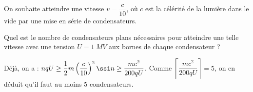 \medskip
On souhaite atteindre une vitesse $v=\dfrac{c}{10}$, où $c$ est la célérité de la lumière dans le vide par une mise en série de condensateurs.


\repriseEntrainement



\begin{enonce}
Quel est le nombre de condensateurs plans nécessaires pour atteindre une telle vitesse avec une tension $U=\SI{1}{MV}$ aux bornes de chaque condensateur ?
\end{enonce}


\begin{corrige}
Déjà, on a : $nqU\geq \dfrac{1}{2}m\left(\dfrac{c}{10}\right)^{2} 
\ssi  n \geq  \dfrac{mc^{2}}{200qU}$.
Comme $\left\lceil \dfrac{mc^{2}}{200qU}\right\rceil =5$, on en déduit qu'il faut  au moins 5 condensateurs. 
\end{corrige}



\finEntrainement












\hauteurLargeurCadreReponse		{8mm}{3cm}
\typeEntrainement				{} %
\initialisationEntrainement


